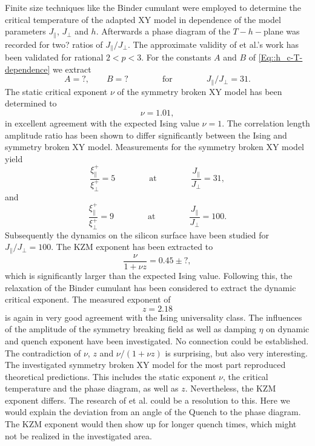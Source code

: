 	Finite size techniques like the Binder cumulant were employed to determine the critical temperature of the adapted XY model in dependence of the model parameters $J_\parallel$, $J_\perp$ and $h$. Afterwards a phase diagram of the $T-h-$plane was recorded for two? ratios of $J_\parallel /	J_\perp$. The approximate validity of \cite{jose1977renormalization} et al.'s work has been validated for rational $2 < p < 3$. For the constants $A$ and $B$ of \eqref{Eq::h_c-T-dependence} we extract
	\begin{equation}
		A = ?, \qquad B = ? \qquad \qquad \text{for} \qquad \qquad J_\parallel /	J_\perp =	31.
	\end{equation}
	The static critical exponent $\nu$ of the symmetry broken XY model has been determined to 
	\begin{equation}
		\nu =	1.01,
	\end{equation}
	in excellent agreement with the expected Ising value $\nu =	1$. The correlation length amplitude ratio has been shown to differ significantly between the Ising and symmetry broken XY model. Measurements for the symmetry broken XY model yield
	\begin{equation}
		\frac{\xi^+_\parallel}{\xi^+_\perp} = 5 \qquad \qquad \text{at} \qquad \qquad \frac{J_\parallel}{J_\perp} =	31,
	\end{equation}
	and
	\begin{equation}
		\frac{\xi^+_\parallel}{\xi^+_\perp} = 9 \qquad \qquad \text{at} \qquad \qquad \frac{J_\parallel}{J_\perp} =	100.
	\end{equation}
	Subsequently the dynamics on the silicon surface have been studied for $J_\parallel /	J_\perp = 100$. The KZM	exponent has been extracted to 
	\begin{equation}
		\frac{\nu}{1 + \nu z} =	0.45 \pm ?,
	\end{equation}
	which is significantly larger than the expected Ising value. Following this, the relaxation of the Binder cumulant has been considered to extract the dynamic critical exponent. The measured exponent of
	\begin{equation}
		z =	2.18
	\end{equation}	
	is again in very good agreement with the Ising universality class. The influences of the amplitude of the symmetry breaking field as well as damping $\eta$ on dynamic and quench exponent have been investigated. No connection could be established. \\
	
	The contradiction of $\nu$, $z$ and $\nu / (1 + \nu z)$ is surprising, but also very interesting. The investigated symmetry broken XY model for the most part reproduced theoretical predictions. This includes the static exponent $\nu$, the critical temperature and the phase diagram, as well as $z$. Nevertheless, the KZM exponent differs. The research of \cite{ladewig2020kibble} et al. could be a resolution to this. Here we would explain the deviation from an angle of the Quench to the phase diagram. The KZM exponent would then show up for longer quench times, which might not be realized in the investigated area.
